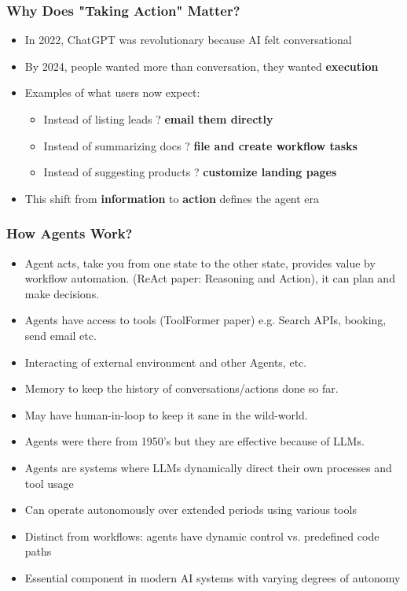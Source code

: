 \begin{frame}[fragile]\frametitle{Why Does "Taking Action" Matter?}
\begin{itemize}
    \item In 2022, ChatGPT was revolutionary because AI felt conversational
    \item By 2024, people wanted more than conversation, they wanted \textbf{execution}
    \item Examples of what users now expect:
    \begin{itemize}
        \item Instead of listing leads ? \textbf{email them directly}
        \item Instead of summarizing docs ? \textbf{file and create workflow tasks}
        \item Instead of suggesting products ? \textbf{customize landing pages}
    \end{itemize}
    \item This shift from \textbf{information} to \textbf{action} defines the agent era
\end{itemize}
\end{frame}


\begin{frame}[fragile]\frametitle{How Agents Work?}
    \begin{itemize}
        \item Agent acts, take you from one state to the other state, provides value by workflow automation. (ReAct paper: Reasoning and Action), it can plan and make decisions.
		\item Agents have access to tools (ToolFormer paper) e.g. Search APIs, booking, send email etc.
		\item Interacting of external environment and other Agents, etc.
		\item Memory to keep the history of conversations/actions done so far.
		\item May have human-in-loop to keep it sane in the wild-world.
		\item Agents were there from 1950's but they are effective because of LLMs.
        \item Agents are systems where LLMs dynamically direct their own processes and tool usage
        \item Can operate autonomously over extended periods using various tools
        \item Distinct from workflows: agents have dynamic control vs. predefined code paths
        \item Essential component in modern AI systems with varying degrees of autonomy
    \end{itemize}
\end{frame}

